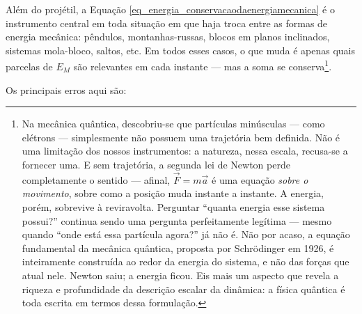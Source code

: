 Além do projétil, a Equação \eqref{eq_energia_conservacaodaenergiamecanica} é o instrumento central em toda situação em que haja troca entre as formas de energia mecânica: pêndulos, montanhas-russas, blocos
em planos inclinados, sistemas mola-bloco, saltos, etc.
Em todos esses casos, o que muda é apenas quais parcelas de $E_M$ são relevantes
em cada instante --- mas a soma se conserva\footnote{Na mecânica quântica, descobriu-se que partículas minúsculas --- como elétrons --- simplesmente não possuem uma trajetória bem definida. Não é uma limitação dos nossos instrumentos: a natureza, nessa escala, recusa-se a fornecer uma. E sem trajetória, a segunda lei de Newton perde completamente o sentido --- afinal, $\vec{F} = m\vec{a}$ é uma equação \textit{sobre o movimento}, sobre como a posição muda instante a instante. A energia, porém, sobrevive à reviravolta. Perguntar ``quanta energia esse sistema possui?'' continua sendo uma pergunta perfeitamente legítima --- mesmo quando ``onde está essa partícula agora?'' já não é. Não por acaso, a equação fundamental da mecânica quântica, proposta por Schrödinger em 1926, é inteiramente construída ao redor da energia do sistema, e não das forças que atual nele. Newton saiu; a energia ficou. Eis mais um aspecto que revela a riqueza e profundidade da descrição escalar da dinâmica: a física quântica é toda escrita em termos dessa formulação.}.




Os principais erros aqui são:

